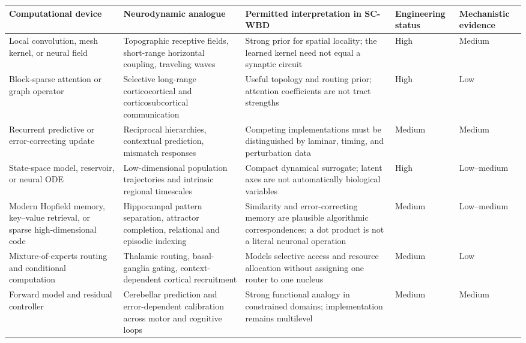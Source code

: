 \begin{table}[t]
\centering
\footnotesize
\setlength{\tabcolsep}{4pt}
\begin{tabularx}{\textwidth}{@{}p{}p{}X p{}p{}@{}}
\toprule
\textbf{Computational device} & \textbf{Neurodynamic analogue} &
\textbf{Permitted interpretation in SC-WBD} & \textbf{Engineering status} &
\textbf{Mechanistic evidence}\\
\midrule
Local convolution, mesh kernel, or neural field &
Topographic receptive fields, short-range horizontal coupling, traveling waves &
Strong prior for spatial locality; the learned kernel need not equal a synaptic circuit &
High & Medium\\

Block-sparse attention or graph operator &
Selective long-range corticocortical and corticosubcortical communication &
Useful topology and routing prior; attention coefficients are not tract strengths &
High & Low\\

Recurrent predictive or error-correcting update &
Reciprocal hierarchies, contextual prediction, mismatch responses &
Competing implementations must be distinguished by laminar, timing, and perturbation data &
Medium & Medium\\

State-space model, reservoir, or neural ODE &
Low-dimensional population trajectories and intrinsic regional timescales &
Compact dynamical surrogate; latent axes are not automatically biological variables &
High & Low--medium\\

Modern Hopfield memory, key--value retrieval, or sparse high-dimensional code &
Hippocampal pattern separation, attractor completion, relational and episodic indexing &
Similarity and error-correcting memory are plausible algorithmic correspondences; a dot product is not a literal neuronal operation &
Medium & Low--medium\\

Mixture-of-experts routing and conditional computation &
Thalamic routing, basal-ganglia gating, context-dependent cortical recruitment &
Models selective access and resource allocation without assigning one router to one nucleus &
Medium & Low\\

Forward model and residual controller &
Cerebellar prediction and error-dependent calibration across motor and cognitive loops &
Strong functional analogy in constrained domains; implementation remains multilevel &
Medium & Medium\\


\end{tabularx}
\end{table}
